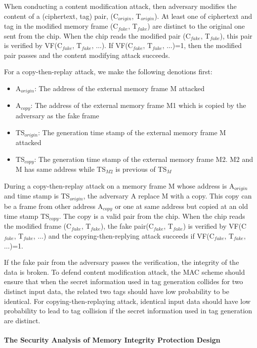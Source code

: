 \documentclass{article}
\begin{document}
When conducting a content modification attack, then adversary modifies the content of a (ciphertext, tag) pair, (C$_{origin}$, T$_{origin}$). At least one of ciphertext and tag in the modified memory frame (C$_{fake}$, T$_{fake}$) are distinct to the original one sent from the chip. When the chip reads the modified pair (C$_{fake}$, T$_{fake}$), this pair is verified by VF(C$_{fake}$, T$_{fake}$, $\ldots$). If VF(C$_{fake}$, T$_{fake}$, $\ldots$)=1, then the modified pair passes and the content modifying attack succeeds. 

For a copy-then-replay attack, we make the following denotions first:
\begin{itemize}
	\item A$_{origin}$: The address of the external memory frame M attacked 
	\item A$_{copy}$: The address of the external memory frame M1 which is copied by the adversary as the fake frame
	\item TS$_{origin}$: The generation time stamp of the external memory frame M attacked
	\item TS$_{copy}$: The generation time stamp of the external memory frame M2. M2 and M has same address while TS$_{M2}$ is previous of TS$_M$ 
\end{itemize}
During a copy-then-replay attack on a memory frame M whose address is A$_{origin}$ and time stamp is TS$_{origin}$, the adversary A replace M with a copy. This copy can be a frame from other address A$_{copy}$ or one at same address but copied at an old time stamp TS$_{copy}$. The copy is a valid pair from the chip. 
When the chip reads the modified frame (C$_{fake}$, T$_{fake}$), the fake pair(C$_{fake}$, T$_{fake}$) is verified by VF(C$_{fake}$, T$_{fake}$, $\ldots$) and the copying-then-replying attack succeeds if VF(C$_{fake}$, T$_{fake}$, $\ldots$)=1.  

If the fake pair from the adversary passes the verification, the integrity of the data is broken. To defend content modification attack, the MAC scheme should ensure that when the secret information used in tag generation collides for two distinct input data, the related two tags should have low probability to be identical. For copying-then-replaying attack, identical input data should have low probability to lead to tag collision if the secret information used in tag generation are distinct. 

\paragraph{The Security Analysis of Memory Integrity Protection Design}
\end{document}
